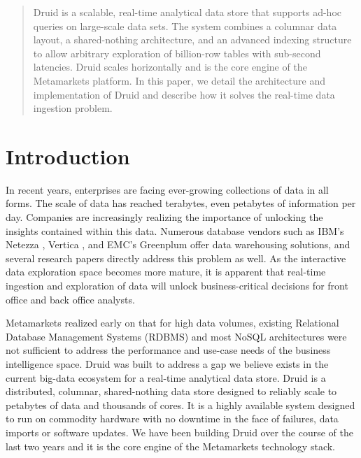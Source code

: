 \documentclass{vldb}
\begin{document}
\maketitle

\begin{abstract}
Druid is a scalable, real-time analytical data store that supports
ad-hoc queries on large-scale data sets. The system combines a
columnar data layout, a shared-nothing architecture, and an advanced
indexing structure to allow arbitrary exploration of billion-row
tables with sub-second latencies. Druid scales horizontally and is the
core engine of the Metamarkets platform. In this paper, we detail the
architecture and implementation of Druid and describe how it solves
the real-time data ingestion problem.
\end{abstract}

\section{Introduction}
In recent years, enterprises are facing ever-growing collections of
data in all forms. The scale of data has reached terabytes, even
petabytes of information per day. Companies are increasingly realizing
the importance of unlocking the insights contained within this
data. Numerous database vendors such as IBM’s Netezza \cite{singh2011introduction}, Vertica
\cite{bear2012vertica}, and EMC’s Greenplum \cite{miner2012unified} offer data warehousing solutions, and
several research papers \cite{barroso2009datacenter,
  chaudhuri1997overview, dewitt1992parallel} directly address this problem as
well. As the interactive data exploration space becomes more mature,
it is apparent that real-time ingestion and exploration of data will
unlock business-critical decisions for front office and back office
analysts.

Metamarkets realized early on that for high data volumes, existing
Relational Database Management Systems (RDBMS) and most NoSQL
architectures were not sufficient to address the performance and
use-case needs of the business intelligence space. Druid was built to
address a gap we believe exists in the current big-data ecosystem for
a real-time analytical data store. Druid is a distributed, columnar,
shared-nothing data store designed to reliably scale to petabytes of
data and thousands of cores. It is a highly available system designed
to run on commodity hardware with no downtime in the face of failures,
data imports or software updates. We have been building Druid over the
course of the last two years and it is the core engine of the
Metamarkets technology stack.
\end{document}

